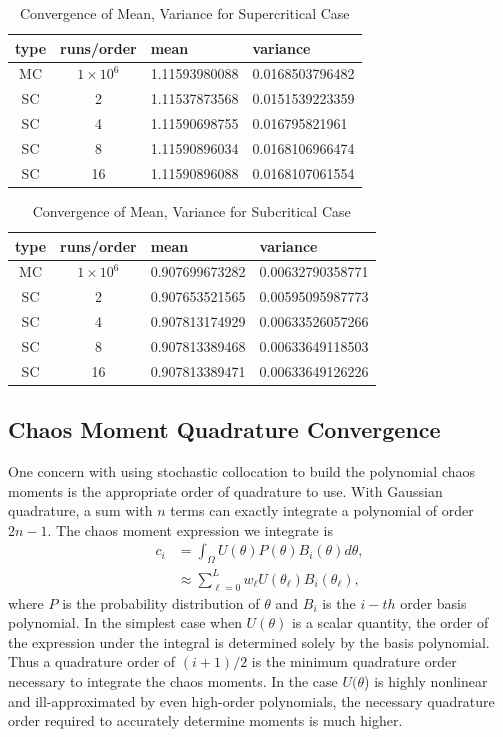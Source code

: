 \begin{table}
\begin{center}
\begin{tabular}{c c|l l}
type & runs/order & mean & variance \\ \hline
MC & $1\times10^6$ & 1.11593980088 & 0.0168503796482 \\
SC & 2 & 1.11537873568 & 0.0151539223359 \\
SC & 4 & 1.11590698755 & 0.016795821961\\
SC & 8 & 1.11590896034 & 0.0168106966474 \\
SC & 16 & 1.11590896088 & 0.0168107061554
\end{tabular}
\end{center}
\caption{Convergence of Mean, Variance for Supercritical Case}
\label{tab:1dsup}
\end{table}

\begin{table}
\begin{center}
\begin{tabular}{c c|l l}
type & runs/order & mean & variance \\ \hline
MC & $1\times10^6$ & 0.907699673282 & 0.00632790358771 \\
SC & 2 & 0.907653521565 & 0.00595095987773 \\
SC & 4 & 0.907813174929 & 0.00633526057266\\
SC & 8 & 0.907813389468 & 0.00633649118503 \\
SC & 16 & 0.907813389471 & 0.00633649126226
\end{tabular}
\end{center}
\caption{Convergence of Mean, Variance for Subcritical Case}
\label{tab:1dsub}
\end{table}

\subsection{Chaos Moment Quadrature Convergence}\label{sec:quadconv}
One concern with using stochastic collocation to build the polynomial chaos moments is the appropriate order of quadrature to use.  With Gaussian quadrature, a sum with $n$ terms can exactly integrate a polynomial of order $2n-1$.  The chaos moment expression we integrate is
\begin{align}
c_i &= \int_\Omega U(\theta)P(\theta)B_i(\theta)d\theta,\\
  &\approx \sum_{\ell=0}^L w_\ell U(\theta_\ell)B_i(\theta_\ell),
\end{align}
where $P$ is the probability distribution of $\theta$ and $B_i$ is the $i-th$ order basis polynomial.  In the simplest case when $U(\theta)$ is a scalar quantity, the order of the expression under the integral is determined solely by the basis polynomial.  Thus a quadrature order of $(i+1)/2$ is the minimum quadrature order necessary to integrate the chaos moments.  In the case $U(\theta$) is highly nonlinear and ill-approximated by even high-order polynomials, the necessary quadrature order required to accurately determine moments is much higher.


